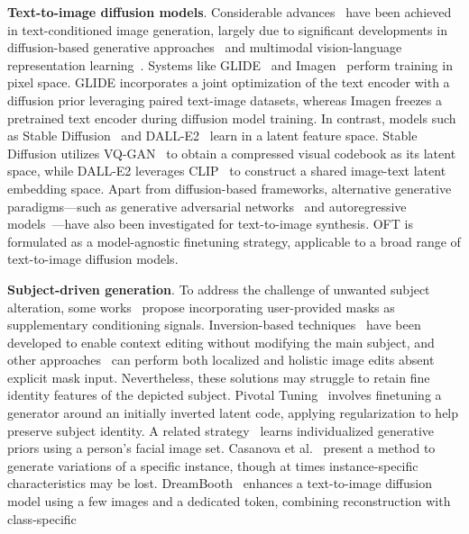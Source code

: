 \textbf{Text-to-image diffusion models}. Considerable advances~\cite{saharia2022photorealistic,ramesh2022hierarchical,rombach2022high,gu2022vector,nichol2022glide} have been achieved in text-conditioned image generation, largely due to significant developments in diffusion-based generative approaches~\cite{ho2020denoising,song2021score,song2021denoising,dhariwal2021diffusion} and multimodal vision-language representation learning~\cite{su2020vlbert,lu2019vilbert,radford2021learning,wang2021simvlm,li2022blip,li2023blip,alayrac2022flamingo,schuhmann2022laion}. Systems like GLIDE~\cite{nichol2022glide} and Imagen~\cite{saharia2022photorealistic} perform training in pixel space. GLIDE incorporates a joint optimization of the text encoder with a diffusion prior leveraging paired text-image datasets, whereas Imagen freezes a pretrained text encoder during diffusion model training. In contrast, models such as Stable Diffusion~\cite{rombach2022high} and DALL-E2~\cite{ramesh2022hierarchical} learn in a latent feature space. Stable Diffusion utilizes VQ-GAN~\cite{esser2021taming} to obtain a compressed visual codebook as its latent space, while DALL-E2 leverages CLIP~\cite{radford2021learning} to construct a shared image-text latent embedding space. Apart from diffusion-based frameworks, alternative generative paradigms—such as generative adversarial networks~\cite{reed2016generative,zhang2017stackgan,xu2018attngan,li2019controllable} and autoregressive models~\cite{ramesh2021zero,ding2021cogview,wu2022nuwa,yuscaling}—have also been investigated for text-to-image synthesis. OFT is formulated as a model-agnostic finetuning strategy, applicable to a broad range of text-to-image diffusion models.

\textbf{Subject-driven generation}. To address the challenge of unwanted subject alteration, some works~\cite{avrahami2022blended,nichol2022glide} propose incorporating user-provided masks as supplementary conditioning signals. Inversion-based techniques~\cite{choi2021ilvr,dhariwal2021diffusion,ramesh2022hierarchical,gal2022image} have been developed to enable context editing without modifying the main subject, and other approaches~\cite{hertz2022prompt} can perform both localized and holistic image edits absent explicit mask input. Nevertheless, these solutions may struggle to retain fine identity features of the depicted subject. Pivotal Tuning~\cite{roich2022pivotal} involves finetuning a generator around an initially inverted latent code, applying regularization to help preserve subject identity. A related strategy~\cite{nitzan2022mystyle} learns individualized generative priors using a person’s facial image set. Casanova et al.~\cite{casanova2021instance} present a method to generate variations of a specific instance, though at times instance-specific characteristics may be lost. DreamBooth~\cite{ruiz2023dreambooth} enhances a text-to-image diffusion model using a few images and a dedicated token, combining reconstruction with class-specific

